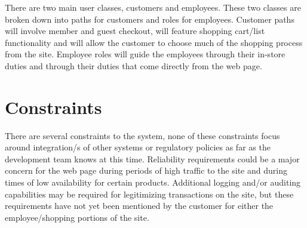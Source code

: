 \documentclass{scrreprt}
\theoremstyle{funreq}
\begin{document}
There are two main user classes, customers and employees. These two classes are broken down into paths for customers and roles for employees. Customer paths will involve member and guest checkout, will feature shopping cart/list functionality and will allow the customer to choose much of the shopping process from the site. Employee roles will guide the employees through their in-store duties and through their duties that come directly from the web page. %

\section{Constraints}
There are several constraints to the system, none of these constraints focus around integration/s of other systems or regulatory policies as far as the development team knows at this time. Reliability requirements could be a major concern for the web page during periods of high traffic to the site and during times of low availability for certain products. Additional logging and/or auditing capabilities may be required for legitimizing transactions on the site, but these requirements have not yet been mentioned by the customer for either the employee/shopping portions of the site. %
\end{document}
